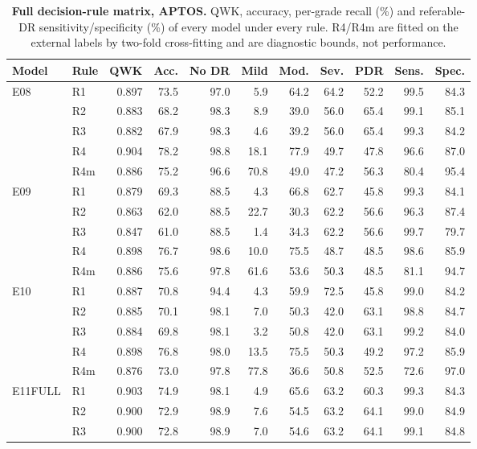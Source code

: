 \begin{table}[h]
\caption{\textbf{Full decision-rule matrix, APTOS.} QWK, accuracy, per-grade recall (\%) and referable-DR sensitivity/specificity (\%) of every model under every rule. R4/R4m are fitted on the external labels by two-fold cross-fitting and are diagnostic bounds, not performance.}\label{tab:s4}
\centering\scriptsize
\begin{tabular}{@{}llrrrrrrrrr@{}}
\toprule
Model & Rule & QWK & Acc. & No DR & Mild & Mod. & Sev. & PDR & Sens. & Spec. \\
\midrule
E08 & R1 & 0.897 & 73.5 & 97.0 & 5.9 & 64.2 & 64.2 & 52.2 & 99.5 & 84.3 \\
 & R2 & 0.883 & 68.2 & 98.3 & 8.9 & 39.0 & 56.0 & 65.4 & 99.1 & 85.1 \\
 & R3 & 0.882 & 67.9 & 98.3 & 4.6 & 39.2 & 56.0 & 65.4 & 99.3 & 84.2 \\
 & R4 & 0.904 & 78.2 & 98.8 & 18.1 & 77.9 & 49.7 & 47.8 & 96.6 & 87.0 \\
 & R4m & 0.886 & 75.2 & 96.6 & 70.8 & 49.0 & 47.2 & 56.3 & 80.4 & 95.4 \\
\addlinespace
E09 & R1 & 0.879 & 69.3 & 88.5 & 4.3 & 66.8 & 62.7 & 45.8 & 99.3 & 84.1 \\
 & R2 & 0.863 & 62.0 & 88.5 & 22.7 & 30.3 & 62.2 & 56.6 & 96.3 & 87.4 \\
 & R3 & 0.847 & 61.0 & 88.5 & 1.4 & 34.3 & 62.2 & 56.6 & 99.7 & 79.7 \\
 & R4 & 0.898 & 76.7 & 98.6 & 10.0 & 75.5 & 48.7 & 48.5 & 98.6 & 85.9 \\
 & R4m & 0.886 & 75.6 & 97.8 & 61.6 & 53.6 & 50.3 & 48.5 & 81.1 & 94.7 \\
\addlinespace
E10 & R1 & 0.887 & 70.8 & 94.4 & 4.3 & 59.9 & 72.5 & 45.8 & 99.0 & 84.2 \\
 & R2 & 0.885 & 70.1 & 98.1 & 7.0 & 50.3 & 42.0 & 63.1 & 98.8 & 84.7 \\
 & R3 & 0.884 & 69.8 & 98.1 & 3.2 & 50.8 & 42.0 & 63.1 & 99.2 & 84.0 \\
 & R4 & 0.898 & 76.8 & 98.0 & 13.5 & 75.5 & 50.3 & 49.2 & 97.2 & 85.9 \\
 & R4m & 0.876 & 73.0 & 97.8 & 77.8 & 36.6 & 50.8 & 52.5 & 72.6 & 97.0 \\
\addlinespace
E11FULL & R1 & 0.903 & 74.9 & 98.1 & 4.9 & 65.6 & 63.2 & 60.3 & 99.3 & 84.3 \\
 & R2 & 0.900 & 72.9 & 98.9 & 7.6 & 54.5 & 63.2 & 64.1 & 99.0 & 84.9 \\
 & R3 & 0.900 & 72.8 & 98.9 & 7.0 & 54.6 & 63.2 & 64.1 & 99.1 & 84.8 \\

\end{tabular}
\end{table}
